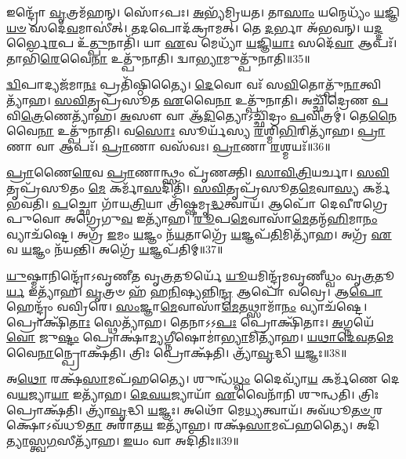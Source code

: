 𑌇𑌨𑍍𑌦𑍍𑌰𑍋᳴ \ul{𑌵𑍃}\-𑌤𑍍𑌰𑌮᳴𑌹𑌨𑍍।
𑌸𑍋᳴𑌽𑌪𑌃।
\-\ul{𑌅}\-𑌭𑍍𑌯᳴𑌮𑍍𑌰𑌿𑌯𑌤।
𑌤𑌾\-\ul{𑌸𑌾𑌂} 𑌯𑌨𑍍𑌮𑍇𑌧𑍍𑌯𑌂᳴ \ul{𑌯}\-𑌜𑍍𑌞𑌿\-\ul{𑌯}\-\-\ul{𑍞} 𑌸𑌦𑍇᳴\-\ul{𑌵}\-𑌮𑌾𑌸𑍀॑𑌤𑍍।
𑌤𑌦𑌪𑍋𑌦᳴𑌕𑍍𑌰𑌾𑌮𑌤𑍍।
𑌤𑍇 \ul{𑌦}\-𑌰𑍍𑌭𑌾 𑌅᳴𑌭𑌵𑌨𑍍।
𑌯\-\ul{𑌦𑍍𑌦}\-𑌰𑍍𑌭𑍈\-\ul{𑌰}\-𑌪 𑌉᳴\-\ul{𑌤𑍍𑌪𑍁}\-𑌨𑌾𑌤𑌿᳴।
𑌯𑌾 \ul{𑌏}\-𑌵 𑌮𑍇𑌧𑍍𑌯𑌾᳴ \ul{𑌯}\-𑌜𑍍𑌞𑌿\-\ul{𑌯𑌾𑌃} 𑌸𑌦𑍇᳴\-\ul{𑌵𑌾} 𑌆𑌪𑌃᳴।
𑌤𑌾𑌭𑌿᳴\-\ul{𑌰𑍇}\-𑌵𑍈\-\ul{𑌨𑌾} 𑌉𑌤𑍍𑌪𑍁᳴𑌨𑌾𑌤𑌿।
𑌦𑍍𑌵𑌾\-\ul{𑌭𑍍𑌯𑌾}\-𑌮𑍁𑌤𑍍𑌪𑍁᳴𑌨𑌾𑌤𑌿॥35॥

\-\ul{𑌦𑍍𑌵𑌿}\-𑌪𑌾𑌦𑍍𑌯𑌜᳴𑌮𑌾\-\ul{𑌨𑌃} 𑌪𑍍𑌰𑌤𑌿᳴\-𑌷𑍍𑌠𑌿𑌤𑍍𑌯𑍈।
\-\ul{𑌦𑍇}\-𑌵𑍋 𑌵𑌃᳴ 𑌸\-\ul{𑌵𑌿}\-𑌤𑍋𑌤𑍍𑌪𑍁᳴\-\ul{𑌨𑌾}\-𑌤𑍍𑌵𑌿𑌤𑍍𑌯𑌾᳴𑌹।
\-\ul{𑌸}\-\-\ul{𑌵𑌿}\-𑌤𑍃𑌪𑍍𑌰᳴𑌸𑍂𑌤 \ul{𑌏}\-𑌵𑍈\-\ul{𑌨𑌾} 𑌉𑌤𑍍𑌪𑍁᳴𑌨𑌾𑌤𑌿।
𑌅𑌚𑍍𑌛𑌿᳴𑌦𑍍𑌰𑍇𑌣 \ul{𑌪}\-𑌵𑌿\-\ul{𑌤𑍍𑌰𑍇}\-𑌣𑍇𑌤𑍍𑌯𑌾᳴𑌹।
\-\ul{𑌅}\-𑌸𑍗 𑌵𑌾 𑌆᳴\-\ul{𑌦𑌿}\-𑌤𑍍𑌯𑍋\-𑌽𑌚𑍍𑌛𑌿᳴𑌦𑍍𑌰𑌂 \ul{𑌪}\-𑌵𑌿𑌤𑍍𑌰𑌮𑍍॑।
𑌤𑍇\-\ul{𑌨𑍈}\-𑌵𑍈\-\ul{𑌨𑌾} 𑌉𑌤𑍍𑌪𑍁᳴𑌨𑌾𑌤𑌿।
𑌵\-\ul{𑌸𑍋𑌃} 𑌸𑍂𑌰𑍍𑌯᳴𑌸𑍍𑌯 \ul{𑌰}\-𑌶𑍍𑌮𑌿\-\ul{𑌭𑌿}\-𑌰𑌿𑌤𑍍𑌯𑌾᳴𑌹।
\-\ul{𑌪𑍍𑌰𑌾}\-𑌣𑌾 𑌵𑌾 𑌆𑌪𑌃᳴।
\-\ul{𑌪𑍍𑌰𑌾}\-𑌣𑌾 𑌵𑌸᳴𑌵𑌃।
\-\ul{𑌪𑍍𑌰𑌾}\-𑌣𑌾 \ul{𑌰}\-𑌶𑍍𑌮𑌯𑌃᳴॥36॥

\-\ul{𑌪𑍍𑌰𑌾}\-𑌣𑍈\-\ul{𑌰𑍇}\-𑌵 \ul{𑌪𑍍𑌰𑌾}\-𑌣𑌾𑌨𑍍𑌥𑍍𑌸𑌂 𑌪𑍃᳴𑌣𑌕𑍍𑌤𑌿।
\-\ul{𑌸𑌾}\-\-\ul{𑌵𑌿}\-\-\ul{𑌤𑍍𑌰𑌿}\-𑌯𑌰𑍍𑌚𑌾।
\-\ul{𑌸}\-\-\ul{𑌵𑌿}\-𑌤𑍃𑌪𑍍𑌰᳴𑌸𑍂𑌤𑌂 \ul{𑌮𑍇} 𑌕𑌰𑍍𑌮𑌾᳴\-\ul{𑌸}\-𑌦𑌿𑌤𑌿᳴।
\-\ul{𑌸}\-\-\ul{𑌵𑌿}\-𑌤𑍃𑌪𑍍𑌰᳴𑌸𑍂𑌤\-\ul{𑌮𑍇}\-𑌵𑌾\-\ul{𑌸𑍍𑌯} 𑌕𑌰𑍍𑌮᳴ 𑌭𑌵𑌤𑌿।
\-\ul{𑌪}\-𑌚𑍍𑌛𑍋 𑌗𑌾᳴𑌯\-\ul{𑌤𑍍𑌰𑌿}\-𑌯𑌾 𑌤𑍍𑌰𑌿᳴𑌷𑍍𑌷𑌮𑍃\-\ul{𑌦𑍍𑌧}\-𑌤𑍍𑌵𑌾𑌯᳴।
𑌆𑌪𑍋᳴ 𑌦𑍇𑌵𑍀𑌰𑌗𑍍𑌰𑍇𑌪𑍁𑌵𑍋 𑌅𑌗𑍍𑌰𑍇𑌗𑍁\-\ul{𑌵} 𑌇𑌤𑍍𑌯𑌾᳴𑌹।
\-\ul{𑌰𑍂}\-𑌪\-\ul{𑌮𑍇}\-𑌵𑌾𑌸𑌾᳴\-\ul{𑌮𑍇}\-𑌤𑌨𑍍𑌮᳴\-\ul{𑌹𑌿}\-𑌮𑌾\-\ul{𑌨𑌂} 𑌵𑍍𑌯𑌾𑌚᳴𑌷𑍍𑌟𑍇।
𑌅𑌗𑍍𑌰᳴ \ul{𑌇}\-𑌮𑌂 \ul{𑌯}\-𑌜𑍍𑌞𑌂 𑌨᳴\-\ul{𑌯}\-𑌤𑌾𑌗𑍍𑌰𑍇᳴ \ul{𑌯}\-𑌜𑍍𑌞𑌪᳴\-\ul{𑌤𑌿}\-𑌮𑌿𑌤𑍍𑌯𑌾᳴𑌹।
𑌅𑌗𑍍𑌰᳴ \ul{𑌏}\-𑌵 \ul{𑌯}\-𑌜𑍍𑌞𑌂 𑌨᳴𑌯𑌨𑍍𑌤𑌿।
𑌅𑌗𑍍𑌰𑍇᳴ \ul{𑌯}\-𑌜𑍍𑌞𑌪᳴𑌤𑌿𑌮𑍍॥37॥

\-\ul{𑌯𑍁}\-𑌷𑍍𑌮𑌾𑌨𑌿𑌨𑍍𑌦𑍍𑌰𑍋᳴\-𑌽𑌵𑍃𑌣𑍀𑌤 𑌵𑍃\-\ul{𑌤𑍍𑌰}\-𑌤𑍂𑌰𑍍𑌯𑍇᳴ \ul{𑌯𑍂}\-𑌯𑌮𑌿𑌨𑍍𑌦𑍍𑌰᳴𑌮𑌵𑍃𑌣𑍀𑌧𑍍𑌵𑌂 𑌵𑍃\-\ul{𑌤𑍍𑌰}\-𑌤𑍂\-\ul{𑌰𑍍𑌯} 𑌇𑌤𑍍𑌯𑌾᳴𑌹।
\-\ul{𑌵𑍃}\-𑌤𑍍𑌰𑍞 𑌹᳴ 𑌹\-\ul{𑌨𑌿}\-𑌷𑍍𑌯𑌨𑍍𑌨𑌿\-\ul{𑌨𑍍𑌦𑍍𑌰} 𑌆𑌪𑍋᳴ 𑌵𑌵𑍍𑌰𑍇।
𑌆\-\ul{𑌪𑍋} 𑌹𑍇𑌨𑍍𑌦𑍍𑌰𑌂᳴ 𑌵𑌵𑍍𑌰𑌿𑌰𑍇।
\-\ul{𑌸𑌂}\-𑌜𑍍𑌞𑌾\-\ul{𑌮𑍇}\-𑌵𑌾𑌸𑌾᳴\-\ul{𑌮𑍇}\-𑌤𑌥𑍍𑌸𑌾𑌮𑌾᳴\-\ul{𑌨𑌂} 𑌵𑍍𑌯𑌾𑌚᳴𑌷𑍍𑌟𑍇।
𑌪𑍍𑌰𑍋𑌕𑍍𑌷𑌿᳴\-\ul{𑌤𑌾𑌃} 𑌸𑍍𑌥𑍇𑌤𑍍𑌯𑌾᳴𑌹।
𑌤𑍇𑌨𑌾𑌽𑌽\-\ul{𑌪𑌃} 𑌪𑍍𑌰𑍋𑌕𑍍𑌷𑌿᳴𑌤𑌾𑌃।
\-\ul{𑌅}\-𑌗𑍍𑌨𑌯𑍇᳴ \ul{𑌵𑍋} 𑌜𑍁\-\ul{𑌷𑍍𑌟𑌂} 𑌪𑍍𑌰𑍋𑌕𑍍𑌷𑌾॑\-\ul{𑌮𑍍𑌯}\-𑌗𑍍𑌨𑍀𑌷𑍋𑌮𑌾॑\-\ul{𑌭𑍍𑌯𑌾}\-𑌮𑌿𑌤𑍍𑌯𑌾᳴𑌹।
\-\ul{𑌯}\-\-\ul{𑌥𑌾}\-\-\ul{𑌦𑍇}\-\-\ul{𑌵}\-𑌤\-\ul{𑌮𑍇}\-𑌵𑍈\-\ul{𑌨𑌾}\-𑌨𑍍𑌪𑍍𑌰𑍋𑌕𑍍𑌷᳴𑌤𑌿।
𑌤𑍍𑌰𑌿𑌃 𑌪𑍍𑌰𑍋𑌕𑍍𑌷᳴𑌤𑌿।
𑌤𑍍𑌰𑍍𑌯𑌾᳴\-\ul{𑌵𑍃}\-𑌦𑍍𑌧𑌿 \ul{𑌯}\-𑌜𑍍𑌞𑌃॥38॥

𑌅\-\ul{𑌥𑍋} 𑌰𑌕𑍍𑌷᳴\-\ul{𑌸𑌾}\-𑌮𑌪᳴𑌹𑌤𑍍𑌯𑍈।
𑌶𑍁𑌨𑍍𑌧᳴\-\ul{𑌧𑍍𑌵𑌂} 𑌦𑍈𑌵𑍍𑌯𑌾᳴\-\ul{𑌯} 𑌕𑌰𑍍𑌮᳴𑌣𑍇 𑌦𑍇𑌵\-\ul{𑌯}\-𑌜𑍍𑌯𑌾\-\ul{𑌯𑌾} 𑌇𑌤𑍍𑌯𑌾᳴𑌹।
\-\ul{𑌦𑍇}\-\-\ul{𑌵}\-\-\ul{𑌯}\-𑌜𑍍𑌯𑌾𑌯𑌾᳴ \ul{𑌏}\-𑌵𑍈𑌨𑌾᳴𑌨𑌿 𑌶𑍁𑌨𑍍𑌧𑌤𑌿।
𑌤𑍍𑌰𑌿𑌃 𑌪𑍍𑌰𑍋𑌕𑍍𑌷᳴𑌤𑌿।
𑌤𑍍𑌰𑍍𑌯𑌾᳴\-\ul{𑌵𑍃}\-𑌦𑍍𑌧𑌿 \ul{𑌯}\-𑌜𑍍𑌞𑌃।
𑌅𑌥𑍋᳴ 𑌮𑍇\-\ul{𑌧𑍍𑌯}\-𑌤𑍍𑌵𑌾𑌯᳴।
𑌅𑌵᳴𑌧𑍂\-\ul{𑌤}\-\-\ul{𑍞} 𑌰𑌕𑍍𑌷𑍋\-𑌽𑌵᳴𑌧𑍂\-\ul{𑌤𑌾} 𑌅𑌰𑌾᳴𑌤\-\ul{𑌯} 𑌇𑌤𑍍𑌯𑌾᳴𑌹।
𑌰𑌕𑍍𑌷᳴\-\ul{𑌸𑌾}\-𑌮𑌪᳴𑌹𑌤𑍍𑌯𑍈।
𑌅𑌦𑌿᳴\-\ul{𑌤𑍍𑌯𑌾}\-𑌸𑍍𑌤𑍍𑌵\-\ul{𑌗}\-𑌸𑍀𑌤𑍍𑌯𑌾᳴𑌹।
\-\ul{𑌇}\-𑌯𑌂 𑌵𑌾 𑌅𑌦𑌿᳴𑌤𑌿𑌃॥39॥

